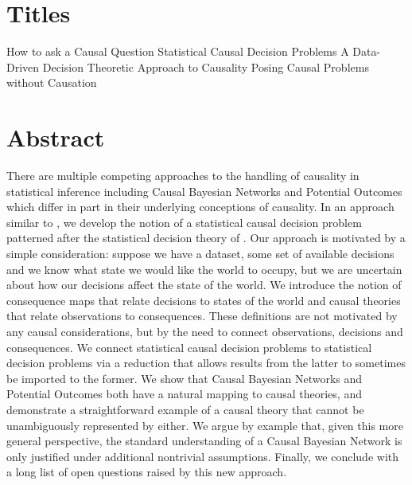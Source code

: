 \section{Titles}

How to ask a Causal Question
Statistical Causal Decision Problems
A Data-Driven Decision Theoretic Approach to Causality
Posing Causal Problems without Causation


\section{Abstract}

There are multiple competing approaches to the handling of causality in statistical inference including Causal Bayesian Networks and Potential Outcomes which differ in part in their underlying conceptions of causality. In an approach similar to \cite{dawid_decision-theoretic_2012}, we develop the notion of a statistical causal decision problem patterned after the statistical decision theory of \cite{wald_statistical_1950}. Our approach is motivated by a simple consideration: suppose we have a dataset, some set of available decisions and we know what state we would like the world to occupy, but we are uncertain about how our decisions affect the state of the world. We introduce the notion of consequence maps that relate decisions to states of the world and causal theories that relate observations to consequences. These definitions are not motivated by any causal considerations, but by the need to connect observations, decisions and consequences. We connect statistical causal decision problems to statistical decision problems via a reduction that allows results from the latter to sometimes be imported to the former. We show that Causal Bayesian Networks and Potential Outcomes both have a natural mapping to causal theories, and demonstrate a straightforward example of a causal theory that cannot be unambiguously represented by either. We argue by example that, given this more general perspective, the standard understanding of a Causal Bayesian Network is only justified under additional nontrivial assumptions. Finally, we conclude with a long list of open questions raised by this new approach.